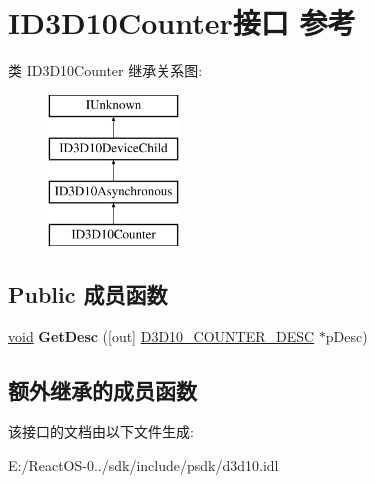 \hypertarget{interface_i_d3_d10_counter}{}\section{I\+D3\+D10\+Counter接口 参考}
\label{interface_i_d3_d10_counter}
类 I\+D3\+D10\+Counter 继承关系图\+:\begin{figure}[H]
\begin{center}
\leavevmode
\includegraphics[height=4.000000cm]{interface_i_d3_d10_counter}
\end{center}
\end{figure}
\subsection*{Public 成员函数}
\begin{DoxyCompactItemize}
\item 
\mbox{\label{interface_i_d3_d10_counter_a47fceca8fd9357a5c30ead4fdf1b3d83}} 
\hyperlink{interfacevoid}{void} {\bfseries Get\+Desc} (\mbox{[}out\mbox{]} \hyperlink{struct_d3_d10___c_o_u_n_t_e_r___d_e_s_c}{D3\+D10\+\_\+\+C\+O\+U\+N\+T\+E\+R\+\_\+\+D\+E\+SC} $\ast$p\+Desc)
\end{DoxyCompactItemize}
\subsection*{额外继承的成员函数}


该接口的文档由以下文件生成\+:\begin{DoxyCompactItemize}
\item 
E\+:/\+React\+O\+S-\/0../sdk/include/psdk/d3d10.\+idl\end{DoxyCompactItemize}
